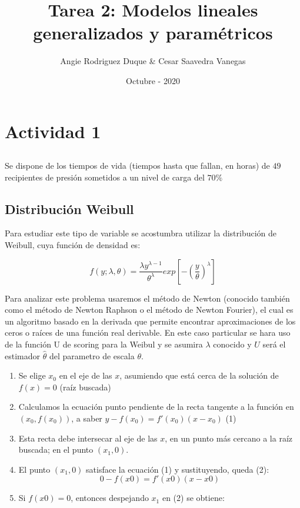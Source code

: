 \documentclass[
]{article}
\title{Tarea 2: Modelos lineales generalizados y paramétricos}
\author{Angie Rodriguez Duque \& Cesar Saavedra Vanegas}
\date{Octubre - 2020}
\begin{document}
\maketitle

\hypertarget{actividad-1}{%
\section{Actividad 1}\label{actividad-1}}

\hypertarget{section}{%
\subsection{}\label{section}}

Se dispone de los tiempos de vida (tiempos hasta que fallan, en horas)
de \(49\) recipientes de presión sometidos a un nivel de carga del
\(70\%\)

\hypertarget{distribuciuxf3n-weibull}{%
\subsection{Distribución Weibull}\label{distribuciuxf3n-weibull}}

Para estudiar este tipo de variable se acostumbra utilizar la
distribución de Weibull, cuya función de densidad es:

\[f(y;\lambda,\theta)=\displaystyle\frac{\lambda y^{\lambda-1}}{\theta^{\lambda}}exp \left[-\left(\frac{y}{\theta}\right)^{\lambda}\right] \]

Para analizar este problema usaremos el método de Newton (conocido
también como el método de Newton Raphson o el método de Newton Fourier),
el cual es un algoritmo basado en la derivada que permite encontrar
aproximaciones de los ceros o raíces de una función real derivable. En
este caso particular se hara uso de la función U de scoring para la
Weibul y se asumira \(\lambda\) conocido y \(U\) será el estimador
\(\hat\theta\) del parametro de escala \(\theta\).

\begin{enumerate}
\def\labelenumi{\arabic{enumi}.}
\item
  Se elige \(x_{0}\) en el eje de las \(x\), asumiendo que está cerca de
  la solución de \(f(x)=0\) (raíz buscada)
\item
  Calculamos la ecuación punto pendiente de la recta tangente a la
  función en \((x_{0},f(x_{0}))\), a saber
  \(y−f(x_{0})=f′(x_{0})(x−x_{0})\) (1)
\item
  Esta recta debe intersecar al eje de las \(x\), en un punto más
  cercano a la raíz buscada; en el punto \((x_{1},0)\).
\item
  El punto \((x_{1},0)\) satisface la ecuación (1) y sustituyendo, queda
  (2): \[0−f(x0)=f′(x0)(x−x0)\]
\item
  Si \(f(x0)=0\), entonces despejando \(x_{1}\) en (2) se obtiene:
\end{enumerate}
\end{document}
